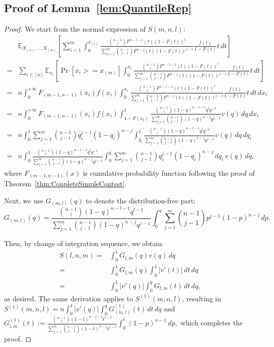 \subsection*{Proof of Lemma~\ref{lem:QuantileRep}}
\begin{proof}
    We start from the normal expression of $S(m,n,l)$:
    \begin{align*}
    & \mathbb{E}_{X_{(1)}, \ldots, X_{(m)}} \left [\sum_{i=1}^{m}\int_{0}^{x_{(i)}}\frac{\binom{n-1}{l}F^{n-l-1}(t)(1-F(t))^{l}}{\sum_{j=1}^{m}\binom{n-1}{j-1}F^{n-j}(t)(1-F(t))^{j-1}}\frac{f(t)}{1-F(t)} t\, dt \right ]\\
    = &\sum_{i\in[n]}\mathbb{E}_{x_i}[\Pr[x_i>=x_{(m)}]\int_{0}^{x_{i}}\frac{\binom{n-1}{l}F^{n-l-1}(t)(1-F(t))^{l}}{\sum_{j=1}^{m}\binom{n-1}{j-1}F^{n-j}(t)(1-F(t))^{j-1}}\frac{f(t)}{1-F(t)} t\,dt]\\
    = &n\int_0^{+\infty} F_{(m-1,n-1)}(x_i)f(x_i)\int_{0}^{x_{i}}\frac{\binom{n-1}{l}F^{n-l-1}(t)(1-F(t))^{l}}{\sum_{j=1}^{m}\binom{n-1}{j-1}F^{n-j}(t)(1-F(t))^{j-1}}\frac{f(t)}{1-F(t)} t\,dt\,dx_i\\
    = &n\int_0^{+\infty} F_{(m-1,n-1)}(x_i)f(x_i)\int_{1-F(x_{i})}^{1}\frac{\binom{n-1}{l}(1-q)^{n-l-1}q^{l}q^{-1}}{\sum_{j=1}^{m}\binom{n-1}{j-1}(1-q)^{n-j}q^{j-1}}v(q)\,dq\,dx_i\\
    = &n\int_0^{1} \sum_{j=1}^{m}\binom{n-1}{j-1}q_i^{j-1}(1-q_i)^{n-j}\int_{q_i}^{1}\frac{\binom{n-1}{l}(1-q)^{n-l-1}q^{l}q^{-1}}{\sum_{j=1}^{m}\binom{n-1}{j-1}(1-q)^{n-j}q^{j-1}}v(q)\,dq \,dq_i\\
    = &n\int_0^{1} \frac{\binom{n-1}{l}(1-q)^{n-l-1}q^{l}q^{-1}}{\sum_{j=1}^{m}\binom{n-1}{j-1}(1-q)^{n-j}q^{j-1}}\int_{0}^{q}\sum_{j=1}^{m}\binom{n-1}{j-1}q_i^{j-1}(1-q_i)^{n-j}\,dq_i\,v(q)\,dq,
\end{align*}where $F_{(m-1,n-1)}(x)$ is cumulative probability function following the proof of Theorem~\ref{thm:ConpleteSimpleContest}.

    Next, we use $G_{(m,l)}(q)$ to denote the distribution-free part:
    \[
    G_{(m,l)}(q)=\frac{\binom{n-1}{l}(1-q)^{n-l-1}q^{l-1}}{\sum_{j=1}^{m}\binom{n-1}{j-1}(1-q)^{n-j}q^{j-1}}\int_{0}^{q}\sum_{j=1}^{m}\binom{n-1}{j-1}p^{j-1}(1-p)^{n-j}\,dp.
    \]

    Then, by change of integration sequence, we obtain:
    \[
    \begin{aligned}
        S(l,n,m) = & \int_0^{1} G_{l,m}(q)v(q)\,dq
        \\ = & \int_0^{1} G_{l,m}(q)\int_{q}^1|v'(t)|\, dt\,dq
        \\ = &\int_0^1|v'(q)|\int_0^qG_{l,m}(t)\,dt\,dq,
    \end{aligned}
    \]as desired. The same derivation applies to $S^{(1)}(m,n,l)$, resulting in $S^{(1)}(m,n, l)= n\int_0^1|v'(q)|\int_0^qG^{(1)}_{(m,l)}(t)\,dt\,dq$ and $G_{l,m}^{(1)}(t):=\frac{\binom{n-1}{l}(1-t)^{n-l-1}t^{l-1}}{\sum_{j=1}^{m}\binom{n-1}{j-1}(1-t)^{n-j}t^{j-1}}\int_{0}^{t}(1-p)^{n-1}\,dp,$ which completes the proof.
\end{proof}

